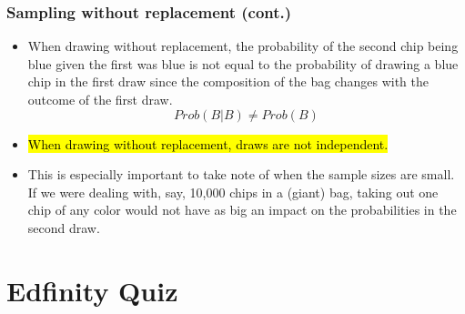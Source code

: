 \documentclass[slidestop,compress,mathserif]{beamer}
\newcommand{\soln}[1]{\textit{#1}}
\begin{document}
\begin{frame}
\frametitle{Sampling without replacement (cont.)}

\begin{itemize}

\item When drawing without replacement, the probability of the second chip being blue given the first was blue is not equal to the probability of drawing a blue chip in the first draw since the composition of the bag changes with the outcome of the first draw.
\[ Prob(B | B) \ne Prob(B) \]

\pause

\item \hl{When drawing without replacement, draws are not independent.}

\pause

\item This is especially important to take note of when the sample sizes are small. If we were dealing with, say, 10,000 chips in a (giant) bag, taking out one chip of any color would not have as big an impact on the probabilities in the second draw.

\end{itemize}

\end{frame}








\section{Edfinity Quiz}
\end{document}
